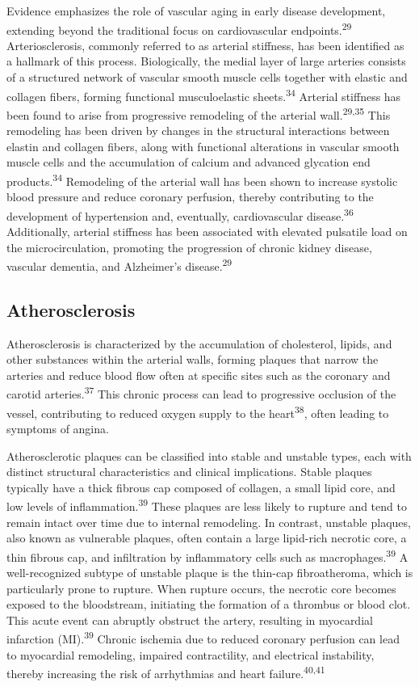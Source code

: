 \documentclass[
  a4paper,
  headsepline=true,
  open=any]{scrbook}
\begin{document}
Evidence emphasizes the role of vascular aging in early disease
development, extending beyond the traditional focus on cardiovascular
endpoints.\textsuperscript{29} Arteriosclerosis, commonly referred to as
arterial stiffness, has been identified as a hallmark of this process.
Biologically, the medial layer of large arteries consists of a
structured network of vascular smooth muscle cells together with elastic
and collagen fibers, forming functional musculoelastic
sheets.\textsuperscript{34} Arterial stiffness has been found to arise
from progressive remodeling of the arterial wall.\textsuperscript{29,35}
This remodeling has been driven by changes in the structural
interactions between elastin and collagen fibers, along with functional
alterations in vascular smooth muscle cells and the accumulation of
calcium and advanced glycation end products.\textsuperscript{34}
Remodeling of the arterial wall has been shown to increase systolic
blood pressure and reduce coronary perfusion, thereby contributing to
the development of hypertension and, eventually, cardiovascular
disease.\textsuperscript{36} Additionally, arterial stiffness has been
associated with elevated pulsatile load on the microcirculation,
promoting the progression of chronic kidney disease, vascular dementia,
and Alzheimer's disease.\textsuperscript{29}

\hypertarget{atherosclerosis}{%
\subsection{Atherosclerosis}\label{atherosclerosis}}

Atherosclerosis is characterized by the accumulation of cholesterol,
lipids, and other substances within the arterial walls, forming plaques
that narrow the arteries and reduce blood flow often at specific sites
such as the coronary and carotid arteries.\textsuperscript{37} This
chronic process can lead to progressive occlusion of the vessel,
contributing to reduced oxygen supply to the heart\textsuperscript{38},
often leading to symptoms of angina.

Atherosclerotic plaques can be classified into stable and unstable
types, each with distinct structural characteristics and clinical
implications. Stable plaques typically have a thick fibrous cap composed
of collagen, a small lipid core, and low levels of
inflammation.\textsuperscript{39} These plaques are less likely to
rupture and tend to remain intact over time due to internal remodeling.
In contrast, unstable plaques, also known as vulnerable plaques, often
contain a large lipid-rich necrotic core, a thin fibrous cap, and
infiltration by inflammatory cells such as
macrophages.\textsuperscript{39} A well-recognized subtype of unstable
plaque is the thin-cap fibroatheroma, which is particularly prone to
rupture. When rupture occurs, the necrotic core becomes exposed to the
bloodstream, initiating the formation of a thrombus or blood clot. This
acute event can abruptly obstruct the artery, resulting in myocardial
infarction (MI).\textsuperscript{39} Chronic ischemia due to reduced
coronary perfusion can lead to myocardial remodeling, impaired
contractility, and electrical instability, thereby increasing the risk
of arrhythmias and heart failure.\textsuperscript{40,41}
\end{document}
